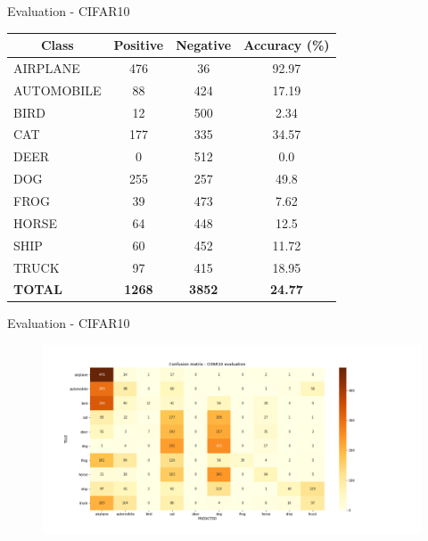\documentclass[t]{beamer}
\begin{document}
\begin{frame}{Evaluation - CIFAR10}
\begin{table}[h!]
\centering
\begin{tabular}{|l|c|c|c|}
\hline
\multicolumn{1}{|c|}{\textbf{Class}} & \textbf{Positive} & \textbf{Negative} & \textbf{Accuracy (\%)}       \\ \hline
AIRPLANE                             & 476               & 36                & {\color[HTML]{32CB00} 92.97} \\ \hline
AUTOMOBILE                           & 88                & 424               & 17.19                        \\ \hline
BIRD                                 & 12                & 500               & 2.34                         \\ \hline
CAT                                  & 177               & 335               & 34.57                        \\ \hline
DEER                                 & 0                 & 512               & {\color[HTML]{FE0000} 0.0}   \\ \hline
DOG                                  & 255               & 257               & 49.8                         \\ \hline
FROG                                 & 39                & 473               & 7.62                         \\ \hline
HORSE                                & 64                & 448               & 12.5                         \\ \hline
SHIP                                 & 60                & 452               & 11.72                        \\ \hline
TRUCK                                & 97                & 415               & 18.95                        \\ \hline
\textbf{TOTAL}                       & \textbf{1268}     & \textbf{3852}     & \textbf{24.77}               \\ \hline
\end{tabular}
\end{table}
\end{frame}

\begin{frame}[c]{Evaluation - CIFAR10}
\begin{figure}
    \centering
    \includegraphics[scale=0.3]{confusion_matrix.png}
\end{figure} 
\end{frame}
\end{document}
